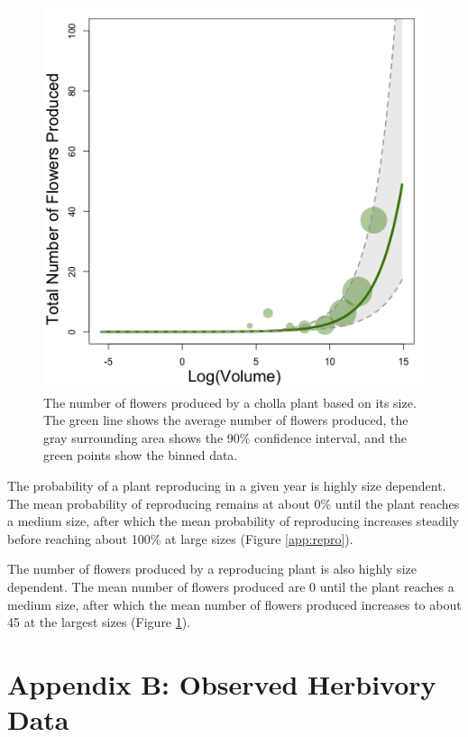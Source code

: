 \documentclass[11pt]{article}
\begin{document}
\begin{figure}
	\includegraphics[width=0.91\linewidth]{Figures/flow.png}
	\caption{The number of flowers produced by a cholla plant based on its size. The green line shows the average number of flowers produced, the gray surrounding area shows the 90\% confidence interval, and the green points show the binned data. }
	\label{app:flow}
\end{figure}

The probability of a plant reproducing in a given year is highly size dependent. 
The mean probability of reproducing remains at about 0\% until the plant reaches a medium size, after which the mean probability of reproducing increases steadily before reaching about 100\% at large sizes (Figure \ref{app:repro}). 

The number of flowers produced by a reproducing plant is also highly size dependent. 
The mean number of flowers produced are 0 until the plant reaches a medium size, after which the mean number of flowers produced increases to about 45 at the largest sizes (Figure \ref{app:flow}).







\section*{Appendix B: Observed Herbivory Data} \label{appendix:B}
\renewcommand{\thefigure}{B\arabic{figure}}
\end{document}
